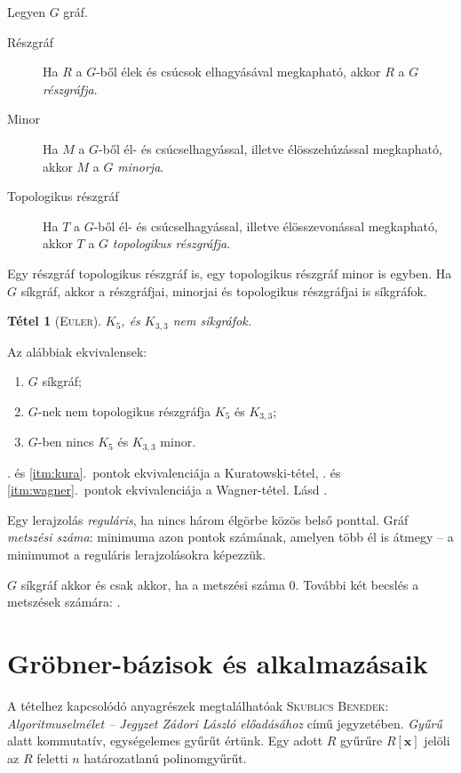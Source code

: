 \documentclass[%
	DIV=15,appendixprefix]{scrreprt}
\newtheorem*{tetel}{Tétel}
\theoremstyle{definition}
\theoremstyle{remark}
\begin{document}
Legyen $ G $ gráf.
\begin{description}
	\item[Részgráf] Ha $R$ a $G$-ből élek és csúcsok elhagyásával megkapható, akkor $R$ a $G$
		\emph{részgráfja}.
	\item[Minor] Ha $M$ a $G$-ből él- és csúcselhagyással, illetve élösszehúzással megkapható, akkor
		$M$ a $G$ \emph{minorja}.
	\item[Topologikus részgráf] Ha $T$ a $G$-ből él- és csúcselhagyással, illetve élösszevonással
		megkapható, akkor $T$ a $G$ \emph{topologikus részgráfja}.
\end{description}
Egy részgráf topologikus részgráf is, egy topologikus részgráf minor is egyben. Ha $G$ síkgráf,
akkor a részgráfjai, minorjai és topologikus részgráfjai is síkgráfok.
\begin{tetel}[\textsc{Euler}]
	$ K_5 $, és $K_{3,{}3}$ nem síkgráfok.
\end{tetel}
%
Az alábbiak ekvivalensek:
\begin{enumerate}
	\item\label{itm:sik} $G$ síkgráf;
	\item\label{itm:kura} $G$-nek nem topologikus részgráfja $K_{5}$ és $K_{3,{}3}$;
	\item\label{itm:wagner} $G$-ben nincs $K_{5}$ és $K_{3,{}3}$ minor.
\end{enumerate}
. és \ref{itm:kura}.~pontok ekvivalenciája a Kuratowski-tétel, . és
\ref{itm:wagner}.~pontok ekvivalenciája a Wagner-tétel.
%
Lásd
\cite[\href{http://www.math.u-szeged.hu/~hajnal/courses/MSc_Diszkret/MSc_kombi13/ea-xszam.pdf}
{\emph{Síkgráfok II. -- Metszési szám és alkalmazásai}}]{DiMat}.

Egy lerajzolás \emph{reguláris}, ha nincs három élgörbe közös belső ponttal. Gráf \emph{metszési
száma}: minimuma azon pontok számának, amelyen több él is átmegy -- a minimumot a reguláris
lerajzolásokra képezzük.

$G$ síkgráf akkor és csak akkor, ha a metszési száma 0. További két becslés a metszések számára:
\cite[\href{http://www.math.u-szeged.hu/~hajnal/courses/MSc_Diszkret/MSc_kombi13/ea-xszam.pdf}
{\emph{Síkgráfok II. -- Metszési szám és alkalmazásai}}, 4.~oldal]{DiMat}.
%
\section{Gröbner-bázisok és alkalmazásaik}
A tételhez kapcsolódó anyagrészek megtalálhatóak \textsc{Skublics Benedek}: \emph{Algoritmuselmélet
-- Jegyzet Zádori László előadásához} \cite{Zadori} című jegyzetében.
%
\emph{Gyűrű} alatt kommutatív, egységelemes gyűrűt értünk. Egy adott $ R $ gyűrűre $ R \left[
\mathbf{ x } \right] $ jelöli az $ R $ feletti $ n $ határozatlanú polinomgyűrűt.
\end{document}
